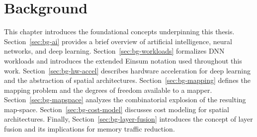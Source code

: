 \chapter{Background}
\label{ch:background}

This chapter introduces the foundational concepts underpinning this thesis.
Section~\ref{sec:bg-ai} provides a brief overview of artificial intelligence,
neural networks, and deep learning.
Section~\ref{sec:bg-workloads} formalizes DNN workloads and introduces the
extended Einsum notation used throughout this work.
Section~\ref{sec:bg-hw-accel} describes hardware acceleration for deep
learning and the abstraction of spatial architectures.
Section~\ref{sec:bg-mapping} defines the mapping problem and the degrees of
freedom available to a mapper.
Section~\ref{sec:bg-mapspace} analyzes the combinatorial explosion of the
resulting map-space.
Section~\ref{sec:bg-cost-model} discusses cost modeling for spatial
architectures.
Finally, Section~\ref{sec:bg-layer-fusion} introduces the concept of layer
fusion and its implications for memory traffic reduction.

